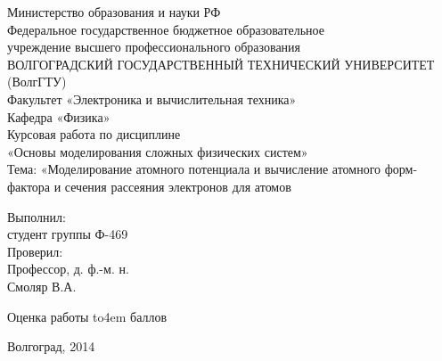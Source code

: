 \documentclass[a4paper,14pt]{extarticle} %
\begin{document}
\begin{titlepage}
\vskip 6cm
\vskip 4cm
\begin{center}
Министерство образования и науки РФ\\
Федеральное государственное бюджетное образовательное\\
учреждение высшего профессионального образования\\
ВОЛГОГРАДСКИЙ ГОСУДАРСТВЕННЫЙ ТЕХНИЧЕСКИЙ УНИВЕРСИТЕТ\\
(ВолгГТУ)\\
Факультет «Электроника и вычислительная техника»\\
Кафедра «Физика»\\
\vskip 2cm
Курсовая работа по дисциплине \\
«Основы моделирования сложных физических систем»\\
Тема: «Моделирование атомного потенциала и вычисление атомного форм-фактора и
сечения рассеяния электронов для атомов %
\end{center}
\vskip 2cm
\begin{flushright}
\parbox{6cm}{
Выполнил:\\
студент группы Ф-469\\
Проверил:\\
Профессор, д. ф.-м. н.\\
Смоляр В.А.\\}
\vskip 2cm
\end{flushright}
\begin{center}
\def\hrf#1{\hbox to#1{\hrulefill}}
Оценка работы \hrf{4em} баллов
\end{center}
\begin{center}
\vskip 3cm
Волгоград, 2014
\end{center}


\end{titlepage}
\end{document}

